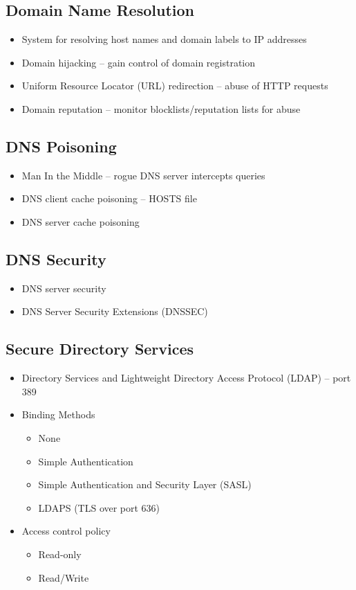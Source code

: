 	\subsection {Domain Name Resolution}
		\begin{itemize}
			\item System for resolving host names and domain labels to IP addresses
			\item Domain hijacking -- gain control of domain registration
			\item Uniform Resource Locator (URL) redirection -- abuse of HTTP requests
			\item Domain reputation -- monitor blocklists/reputation lists for abuse
		\end{itemize}
	\subsection {DNS Poisoning}
		\begin{itemize}
			\item Man In the Middle -- rogue DNS server intercepts queries
			\item DNS client cache poisoning -- HOSTS file
			\item DNS server cache poisoning
		\end{itemize}
	\subsection {DNS Security}
		\begin{itemize}
			\item DNS server security
			\item DNS Server Security Extensions (DNSSEC)
		\end{itemize}
	\subsection {Secure Directory Services}
		\begin{itemize}
			\item Directory Services and Lightweight Directory Access Protocol (LDAP) --
				port 389
			\item Binding Methods
				\begin{itemize}
					\item None
					\item Simple Authentication
					\item Simple Authentication and Security Layer (SASL)
					\item LDAPS (TLS over port 636)
				\end{itemize}
			\item Access control policy
				\begin{itemize}
					\item Read-only
					\item Read/Write
				\end{itemize}
		\end{itemize}
